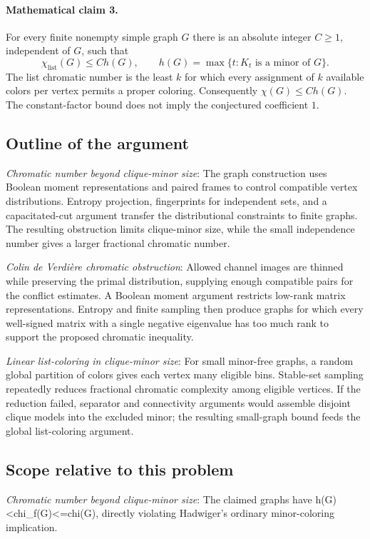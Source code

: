 \documentclass[11pt]{article}
\begin{document}
\paragraph{Mathematical claim 3.} For every finite nonempty simple graph $G$ there is an absolute integer $C\ge1$, independent of $G$, such that \[\chi_{\mathrm{list}}(G)\le C h(G),\qquad h(G)=\max\{t:K_t\text{ is a minor of }G\}.\] The list chromatic number is the least $k$ for which every assignment of $k$ available colors per vertex permits a proper coloring. Consequently $\chi(G)\le Ch(G)$. The constant-factor bound does not imply the conjectured coefficient $1$.

\subsection{Outline of the argument}
\textit{Chromatic number beyond clique-minor size}: The graph construction uses Boolean moment representations and paired frames to control compatible vertex distributions. Entropy projection, fingerprints for independent sets, and a capacitated-cut argument transfer the distributional constraints to finite graphs. The resulting obstruction limits clique-minor size, while the small independence number gives a larger fractional chromatic number.

\textit{Colin de Verdière chromatic obstruction}: Allowed channel images are thinned while preserving the primal distribution, supplying enough compatible pairs for the conflict estimates. A Boolean moment argument restricts low-rank matrix representations. Entropy and finite sampling then produce graphs for which every well-signed matrix with a single negative eigenvalue has too much rank to support the proposed chromatic inequality.

\textit{Linear list-coloring in clique-minor size}: For small minor-free graphs, a random global partition of colors gives each vertex many eligible bins. Stable-set sampling repeatedly reduces fractional chromatic complexity among eligible vertices. If the reduction failed, separator and connectivity arguments would assemble disjoint clique models into the excluded minor; the resulting small-graph bound feeds the global list-coloring argument.

\subsection{Scope relative to this problem}
\textit{Chromatic number beyond clique-minor size}: The claimed graphs have h(G)<chi\_f(G)<=chi(G), directly violating Hadwiger’s ordinary minor-coloring implication.
\end{document}
